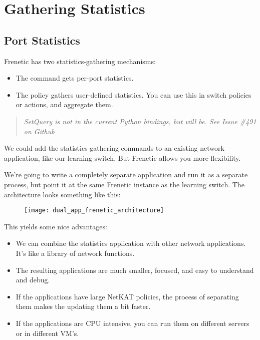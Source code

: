 
\chapter{Gathering Statistics}
\label{chapter:statistics}

\section{Port Statistics}

Frenetic has two statistics-gathering mechanisms:

\begin{itemize}
\item The  command gets per-port statistics.
\item The  policy gathers user-defined statistics.  You can use this in switch
policies or  actions, and aggregate them.
\end{itemize}

\begin{quotation}
\emph{SetQuery is not in the current Python bindings, but will be.  See Issue \#491 on Github}
\end{quotation}

We could add the statistics-gathering commands to an existing network application, like our learning
switch.  But Frenetic allows you more flexibility.   

We're going to write a completely separate application and run it as a separate process, but point it
at the same Frenetic instance as the learning switch.  The architecture looks something like this:

\begin{figure}[h]
\centering
\texttt{[image: dual\_app\_frenetic\_architecture]}
\end{figure}

This yields some nice advantages:

\begin{itemize}
\item We can combine the statistics application with other network applications.  It's like a 
library of network functions.
\item The resulting applications are much smaller, focused, and easy to understand and debug.
\item If the applications have large NetKAT policies, the process of separating them makes the 
updating them a bit faster.
\item If the applications are CPU intensive, you can run them on different servers or in different VM's.
\end{itemize}

